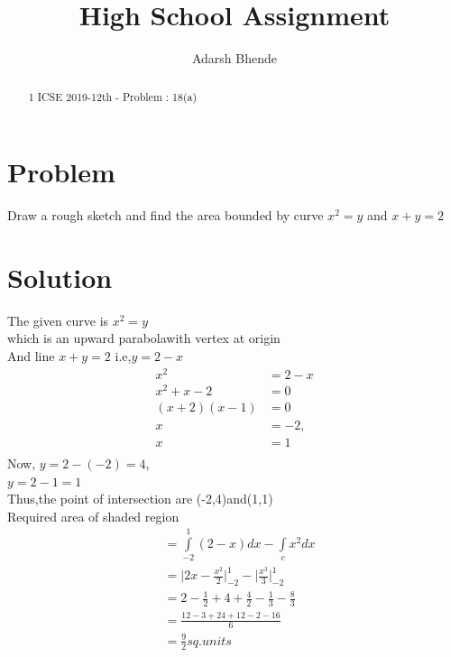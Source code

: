 \documentclass[twocolumn,3p]{elsarticle}
\begin{document}
\title{High School Assignment}
\author{Adarsh Bhende}

\maketitle

\begin{abstract}
1 ICSE 2019-12th - Problem : 18(a)
\end{abstract}
\section{Problem}
Draw a rough sketch and find the area bounded by curve $x^2=y$ and $x+y=2$
\section {Solution}
The given curve is $x^2=y$ \\
which is an upward parabolawith vertex at origin\\
And line $x+y=2$ i.e,$y=2-x$\\
\begin{align}
x^2&=2-x\\
x^2+x-2&=0\\
(x+2)(x-1)&=0\\
x&=-2 , \\
  x&=1 \\
\end{align}
Now, $y=2-(-2)=4$,\\
$y=2-1=1$\\
Thus,the point of intersection are (-2,4)and(1,1)\\
Required area of shaded region\\
\begin{align}
&=\int\limits_{-2}^{1}(2-x)dx - \int\limits_cx^2dx\\
&=\bigg|2x-\frac{x^2}{2}\bigg|^{1}_{-2}-\bigg|\frac{x^3}{3}\bigg|^{1}_{-2}\\
&=2-\frac{1}{2}+4+\frac{4}{2}-\frac{1}{3}-\frac{8}{3}\\
&=\frac{12-3+24+12-2-16}{6}\\
&=\frac{9}{2}sq.units
\end{align}
\end{document}
